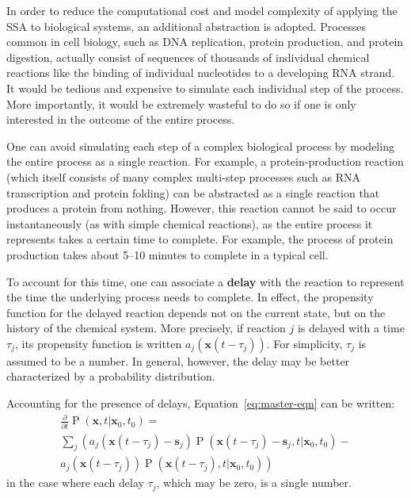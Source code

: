 \documentclass[english,letterpaper,12pt]{article}
\newcommand{\defkeywd}[1]{\textbf{#1}}
\renewcommand{\vec}[1]{\ensuremath{\mathbf{#1}}}
\DeclareMathOperator{\Prob}{P}
\newcommand{\delaytime}{\ensuremath{\tau}}
\begin{document}
\begin{doublespacing}
In order to reduce the computational cost and model complexity of applying the SSA to biological systems, an additional abstraction is adopted. Processes common in cell biology, such as DNA replication, protein production, and protein digestion, actually consist of sequences of thousands  of individual chemical reactions like the binding of individual nucleotides to a developing RNA strand. It would be tedious and expensive to simulate each individual step of the process. More importantly, it would be extremely wasteful to do so if one is only interested in the outcome of the entire process. 

One can avoid simulating each step of a complex biological process by modeling the entire process as a single reaction. For example, a protein-production reaction (which itself consists of many complex multi-step processes such as RNA transcription and protein folding) can be abstracted as a single reaction that produces a protein from nothing. However, this reaction cannot be said to occur instantaneously (as with simple chemical reactions), as the entire process it represents takes a certain time to complete. For example, the process of protein production  takes about 5--10 minutes to complete in a typical cell. 

To account for this time, one can associate a \defkeywd{delay} with the reaction to represent the time the underlying process needs to complete. In effect, the propensity function for the delayed reaction depends not on the current state, but on the history of the chemical system. More precisely, if reaction $j$ is delayed with a time $\delaytime_j$, its propensity function is written $a_j \left(\vec{x}(t - \delaytime_j) \right)$. For simplicity, $\delaytime_j$ is assumed to be a number. In general, however, the delay may be better characterized by a probability distribution.

Accounting for the presence of delays, Equation~\eqref{eq:master-eqn} can be written: 
\begin{multline}
    \frac{\partial}{\partial t} \Prob(\vec{x}, t | \vec{x}_0, t_0) = \\
    \sum_j \left( a_j (\vec{x}(t - \delaytime_j) - \vec{s}_j) \Prob(\vec{x}(t - \delaytime_j) - \vec{s}_j, t | \vec{x}_0, t_0) - \right.\\
    \left. a_j(\vec{x}(t - \delaytime_j)) \Prob(\vec{x}(t - \delaytime_j), t | \vec{x}_0, t_0) \right)
    \label{eq:master-eqn-delay}
\end{multline}
in the case where each delay $\tau_j$, which may be zero, is a single number.


\end{doublespacing}
\end{document}
